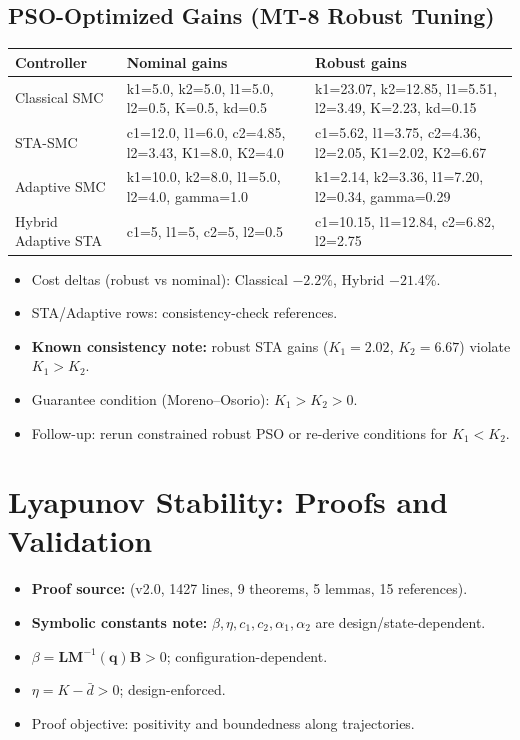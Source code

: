 \documentclass[10pt, a4paper]{article}
\newcommand{\vq}{\boldsymbol{q}}
\begin{document}
\subsection{PSO-Optimized Gains (MT-8 Robust Tuning)}

\begin{center}
\small
\begin{tabularx}{\columnwidth}{@{}p{2.2cm}YY@{}}
\toprule
\textbf{Controller} & \textbf{Nominal gains} & \textbf{Robust gains} \\
\midrule
Classical SMC &
k1=5.0, k2=5.0, l1=5.0, l2=0.5, K=0.5, kd=0.5 &
k1=23.07, k2=12.85, l1=5.51, l2=3.49, K=2.23, kd=0.15 \\
STA-SMC &
c1=12.0, l1=6.0, c2=4.85, l2=3.43, K1=8.0, K2=4.0 &
c1=5.62, l1=3.75, c2=4.36, l2=2.05, K1=2.02, K2=6.67 \\
Adaptive SMC &
k1=10.0, k2=8.0, l1=5.0, l2=4.0, gamma=1.0 &
k1=2.14, k2=3.36, l1=7.20, l2=0.34, gamma=0.29 \\
Hybrid Adaptive STA &
c1=5, l1=5, c2=5, l2=0.5 &
c1=10.15, l1=12.84, c2=6.82, l2=2.75 \\
\bottomrule
\end{tabularx}
\end{center}

\begin{itemize}[leftmargin=1.5em,itemsep=0.2em]
  \item Cost deltas (robust vs nominal): Classical $-2.2\%$, Hybrid $-21.4\%$.
  \item STA/Adaptive rows: consistency-check references.
  \item \textbf{Known consistency note:}
  robust STA gains ($K_1=2.02$, $K_2=6.67$) violate $K_1>K_2$.
  \item Guarantee condition (Moreno--Osorio): $K_1>K_2>0$.
  \item Follow-up: rerun constrained robust PSO or re-derive conditions for $K_1<K_2$.
\end{itemize}

\section{Lyapunov Stability: Proofs and Validation}

\begin{itemize}[leftmargin=1.5em,itemsep=0.2em]
  \item \textbf{Proof source:}
  (v2.0, 1427 lines, 9 theorems, 5 lemmas, 15 references).
  \item \textbf{Symbolic constants note:}
  $\beta,\eta,c_1,c_2,\alpha_1,\alpha_2$ are design/state-dependent.
  \item $\beta = \mathbf{L}\mathbf{M}^{-1}(\vq)\mathbf{B} > 0$; configuration-dependent.
  \item $\eta = K-\bar{d} > 0$; design-enforced.
  \item Proof objective: positivity and boundedness along trajectories.
\end{itemize}
\end{document}
